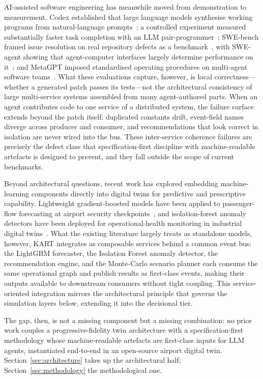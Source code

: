 \documentclass[runningheads]{llncs}
\begin{document}
AI-assisted software engineering has meanwhile moved from demonstration to measurement. Codex established that large language models synthesise working programs from natural-language prompts~\cite{chen2021codex}; a controlled experiment measured substantially faster task completion with an LLM pair-programmer~\cite{peng2023copilot}; SWE-bench framed issue resolution on real repository defects as a benchmark~\cite{swebench2024}, with SWE-agent showing that agent-computer interfaces largely determine performance on it~\cite{yang2024sweagent}; and MetaGPT imposed standardised operating procedures on multi-agent software teams~\cite{hong2024metagpt}. What these evaluations capture, however, is local correctness---whether a generated patch passes its tests---not the architectural consistency of large multi-service systems assembled from many agent-authored parts. When an agent contributes code to one service of a distributed system, the failure surface extends beyond the patch itself: duplicated constants drift, event-field names diverge across producer and consumer, and recommendations that look correct in isolation are never wired into the bus. These inter-service coherence failures are precisely the defect class that specification-first discipline with machine-readable artefacts is designed to prevent, and they fall outside the scope of current benchmarks.

Beyond architectural questions, recent work has explored embedding machine-learning components directly into digital twins for predictive and prescriptive capability. Lightweight gradient-boosted models have been applied to passenger-flow forecasting at airport security checkpoints~\cite{ke2017,schultz2019}, and isolation-forest anomaly detectors have been deployed for operational-health monitoring in industrial digital twins~\cite{liu2008}. What the existing literature largely treats as standalone models, however, KART integrates as composable services behind a common event bus: the LightGBM forecaster, the Isolation Forest anomaly detector, the recommendation engine, and the Monte-Carlo scenario planner each consume the same operational graph and publish results as first-class events, making their outputs available to downstream consumers without tight coupling. This service-oriented integration mirrors the architectural principle that governs the simulation layers below, extending it into the decisional tier.

The gap, then, is not a missing component but a missing combination: no prior work couples a progressive-fidelity twin architecture with a specification-first methodology whose machine-readable artefacts are first-class inputs for LLM agents, instantiated end-to-end in an open-source airport digital twin. Section~\ref{sec:architecture} takes up the architectural half; Section~\ref{sec:methodology} the methodological one.
\end{document}
